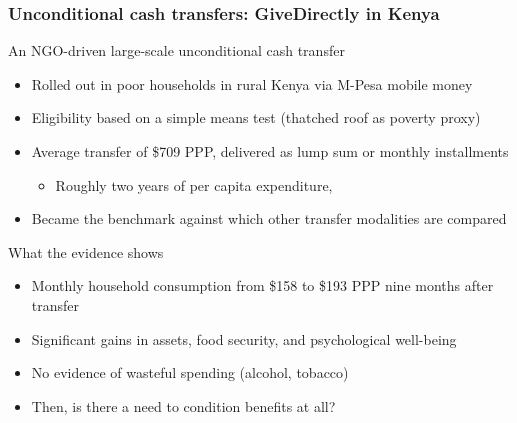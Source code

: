 \documentclass[aspectratio=169]{beamer}
\begin{document}
\begin{frame}
\frametitle{Unconditional cash transfers: GiveDirectly in Kenya}
An NGO-driven large-scale unconditional cash transfer
\begin{itemize}\setlength\itemsep{3pt}
\item Rolled out in poor households in rural Kenya via M-Pesa mobile money
\item Eligibility based on a simple means test (thatched roof as poverty proxy) 
\item Average transfer of \$709 PPP, delivered as lump sum or monthly installments
\begin{itemize}\setlength\itemsep{3pt}
\item Roughly two years of per capita expenditure, 
\end{itemize}
\item Became the benchmark against which other transfer modalities are compared
\end{itemize}\medskip
What the evidence shows 
\begin{itemize}\setlength\itemsep{3pt}
\item Monthly household consumption from \$158 to \$193 PPP nine months after transfer
\item Significant gains in assets, food security, and psychological well-being
\item No evidence of wasteful spending (alcohol, tobacco)
\item Then, is there a need to condition benefits at all?
\end{itemize}
\end{frame}
\end{document}
